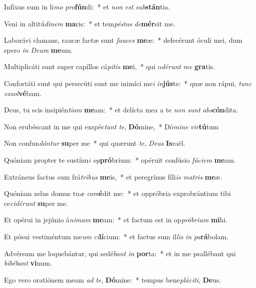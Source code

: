 \item Infíxus sum in li\textit{mo} \textit{pro}\textbf{fún}di:~* et \textit{non} \textit{est} \textit{sub}\textbf{stán}tia.
\item Veni in altitú\textit{di}\textit{nem} \textbf{ma}ris:~* et tem\textit{pés}\textit{tas} \textit{de}\textbf{mér}sit me.
\item Laborávi clamans, raucæ factæ sunt \textit{fau}\textit{ces} \textbf{me}æ:~* defecérunt óculi mei, dum spero \textit{in} \textit{De}\textit{um} \textbf{me}um.
\item Multiplicáti sunt super capíllos cá\textit{pi}\textit{tis} \textbf{me}i,~* qui o\textit{dé}\textit{runt} \textit{me} \textbf{gra}tis.
\item Confortáti sunt qui persecúti sunt me inimíci me\textit{i} \textit{in}\textbf{jús}te:~* quæ non rápui, \textit{tunc} \textit{ex}\textit{sol}\textbf{vé}bam.
\item Deus, tu scis insipién\textit{ti}\textit{am} \textbf{me}am:~* et delícta mea a te \textit{non} \textit{sunt} \textit{abs}\textbf{cón}dita.
\item Non erubéscant in me qui exspéc\textit{tant} \textit{te}, \textbf{Dó}mine,~* Dó\textit{mi}\textit{ne} \textit{vir}\textbf{tú}tum
\item Non confun\textit{dán}\textit{tur} \textbf{su}per me~* qui quærunt \textit{te}, \textit{De}\textit{us} \textbf{Is}raël.
\item Quóniam propter te sustínu\textit{i} \textit{op}\textbf{pró}brium:~* opéruit confúsio \textit{fá}\textit{ci}\textit{em} \textbf{me}am.
\item Extráneus factus sum frá\textit{tri}\textit{bus} \textbf{me}is,~* et peregrínus fíli\textit{is} \textit{ma}\textit{tris} \textbf{me}æ.
\item Quóniam zelus domus tu\textit{æ} \textit{com}\textbf{é}dit me:~* et oppróbria exprobrántium tibi ce\textit{ci}\textit{dé}\textit{runt} \textbf{su}per me.
\item Et opérui in jejúnio á\textit{ni}\textit{mam} \textbf{me}am:~* et factum est in op\textit{pró}\textit{bri}\textit{um} \textbf{mi}hi.
\item Et pósui vestiméntum me\textit{um} \textit{ci}\textbf{lí}cium:~* et factus sum il\textit{lis} \textit{in} \textit{pa}\textbf{rá}bolam.
\item Advérsum me loquebántur, qui sedé\textit{bant} \textit{in} \textbf{por}ta:~* et in me psallébant qui \textit{bi}\textit{bé}\textit{bant} \textbf{vi}num.
\item Ego vero oratiónem meam \textit{ad} \textit{te}, \textbf{Dó}mine:~* tempus bene\textit{plá}\textit{ci}\textit{ti}, \textbf{De}us.
